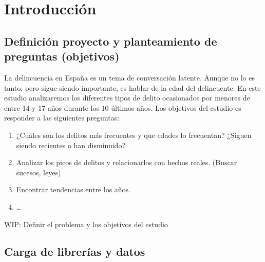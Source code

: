 \documentclass[,,,,pdftex]{Definitions/mdpi}
\providecommand{\tightlist}{%
  \setlength{\itemsep}{0pt}\setlength{\parskip}{0pt}}
\begin{document}

\section{Introducción}\label{introducciuxf3n}

\subsection{Definición proyecto y planteamiento de preguntas
(objetivos)}\label{definiciuxf3n-proyecto-y-planteamiento-de-preguntas-objetivos}

La delincuencia en España es un tema de conversación latente. Aunque no
lo es tanto, pero sigue siendo importante, es hablar de la edad del
delincuente. En este estudio analizaremos los diferentes tipos de delito
ocasionados por menores de entre 14 y 17 años durante los 10 últimos
años. Los objetivos del estudio es responder a las siguientes preguntas:

\begin{enumerate}
\def\labelenumi{\arabic{enumi}.}
\tightlist
\item
  ¿Cuáles son los delitos más frecuentes y que edades lo frecuentan?
  ¿Siguen siendo recientes o han disminuido?
\item
  Analizar los picos de delitos y relacionarlos con hechos reales.
  (Buscar sucesos, leyes)
\item
  Encontrar tendencias entre los años.
\item
  \ldots{}
\end{enumerate}

WIP: Definir el problema y los objetivos del estudio

\subsection{Carga de librerías y
datos}\label{carga-de-libreruxedas-y-datos}
\end{document}

